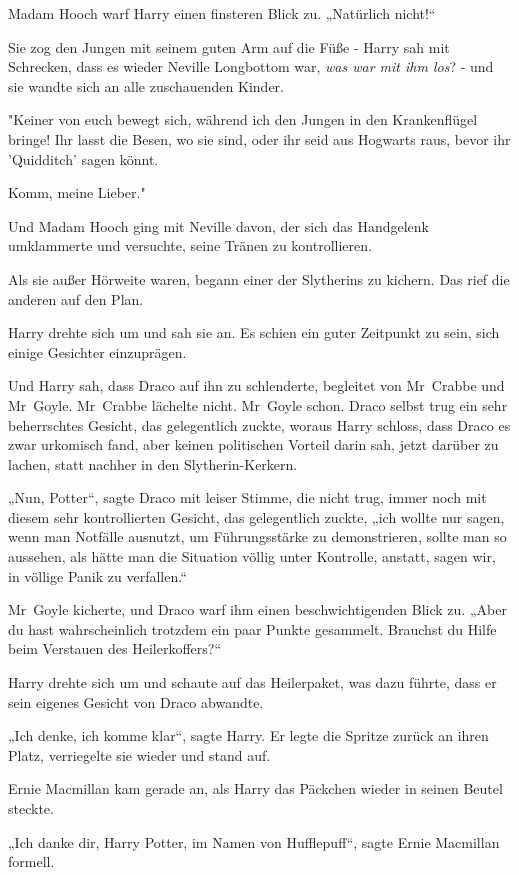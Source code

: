 {Madam Hooch warf Harry einen finsteren Blick zu. „Natürlich nicht!“

Sie zog den Jungen mit seinem guten Arm auf die Füße - Harry sah mit Schrecken, dass es wieder Neville Longbottom war, \emph{was war mit ihm los}? - und sie wandte sich an alle zuschauenden Kinder.

"Keiner von euch bewegt sich, während ich den Jungen in den Krankenflügel bringe! Ihr lasst die Besen, wo sie sind, oder ihr seid aus Hogwarts raus, bevor ihr 'Quidditch' sagen könnt.

Komm, meine Lieber."

Und Madam Hooch ging mit Neville davon, der sich das Handgelenk umklammerte und versuchte, seine Tränen zu kontrollieren.

Als sie außer Hörweite waren, begann einer der Slytherins zu kichern. Das rief die anderen auf den Plan.

Harry drehte sich um und sah sie an. Es schien ein guter Zeitpunkt zu sein, sich einige Gesichter einzuprägen.

Und Harry sah, dass Draco auf ihn zu schlenderte, begleitet von Mr~Crabbe und Mr~Goyle. Mr~Crabbe lächelte nicht. Mr~Goyle schon. Draco selbst trug ein sehr beherrschtes Gesicht, das gelegentlich zuckte, woraus Harry schloss, dass Draco es zwar urkomisch fand, aber keinen politischen Vorteil darin sah, jetzt darüber zu lachen, statt nachher in den Slytherin-Kerkern.

„Nun, Potter“, sagte Draco mit leiser Stimme, die nicht trug, immer noch mit diesem sehr kontrollierten Gesicht, das gelegentlich zuckte, „ich wollte nur sagen, wenn man Notfälle ausnutzt, um Führungsstärke zu demonstrieren, sollte man so aussehen, als hätte man die Situation völlig unter Kontrolle, anstatt, sagen wir, in völlige Panik zu verfallen.“

Mr~Goyle kicherte, und Draco warf ihm einen beschwichtigenden Blick zu. „Aber du hast wahrscheinlich trotzdem ein paar Punkte gesammelt. Brauchst du Hilfe beim Verstauen des Heilerkoffers?“

Harry drehte sich um und schaute auf das Heilerpaket, was dazu führte, dass er sein eigenes Gesicht von Draco abwandte.

„Ich denke, ich komme klar“, sagte Harry. Er legte die Spritze zurück an ihren Platz, verriegelte sie wieder und stand auf.

Ernie Macmillan kam gerade an, als Harry das Päckchen wieder in seinen Beutel steckte.

„Ich danke dir, Harry Potter, im Namen von Hufflepuff“, sagte Ernie Macmillan formell.

}
